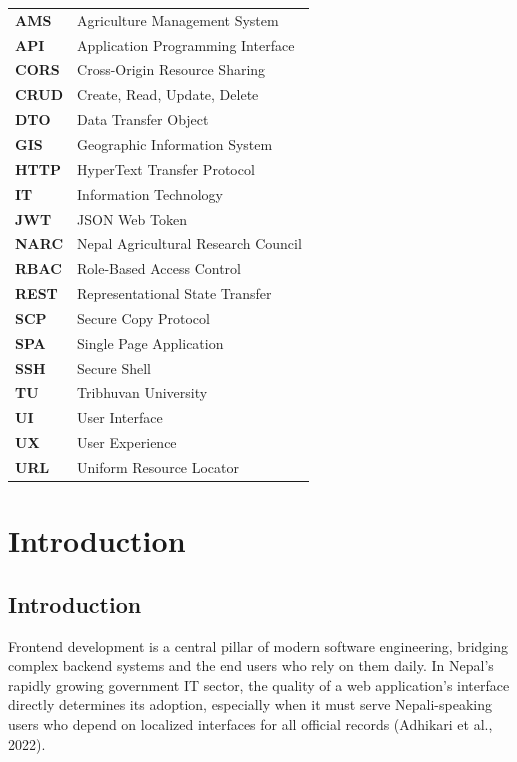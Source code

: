 \documentclass[12pt,a4paper]{report}
\begin{document}
\begin{longtable}{p{3cm} p{10cm}}
\textbf{AMS}  & Agriculture Management System \\
\textbf{API}  & Application Programming Interface \\
\textbf{CORS} & Cross-Origin Resource Sharing \\
\textbf{CRUD} & Create, Read, Update, Delete \\
\textbf{DTO}  & Data Transfer Object \\
\textbf{GIS}  & Geographic Information System \\
\textbf{HTTP} & HyperText Transfer Protocol \\
\textbf{IT}   & Information Technology \\
\textbf{JWT}  & JSON Web Token \\
\textbf{NARC} & Nepal Agricultural Research Council \\
\textbf{RBAC} & Role-Based Access Control \\
\textbf{REST} & Representational State Transfer \\
\textbf{SCP}  & Secure Copy Protocol \\
\textbf{SPA}  & Single Page Application \\
\textbf{SSH}  & Secure Shell \\
\textbf{TU}   & Tribhuvan University \\
\textbf{UI}   & User Interface \\
\textbf{UX}   & User Experience \\
\textbf{URL}  & Uniform Resource Locator \\
\end{longtable}

\newpage
{}

\chapter{Introduction}

\section{Introduction}

Frontend development is a central pillar of modern software engineering, bridging complex
backend systems and the end users who rely on them daily. In Nepal's rapidly growing
government IT sector, the quality of a web application's interface directly determines its
adoption, especially when it must serve Nepali-speaking users who depend on localized
interfaces for all official records (Adhikari et al., 2022).
\end{document}
